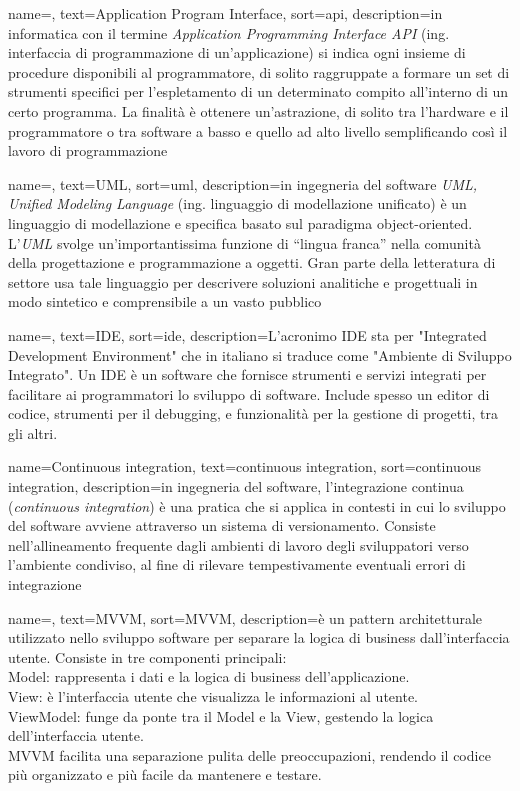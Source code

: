  {
    name=,
    text=Application Program Interface,
    sort=api,
    description={in informatica con il termine \emph{Application Programming Interface API} (ing. interfaccia di programmazione di un'applicazione) si indica ogni insieme di procedure disponibili al programmatore, di solito raggruppate a formare un set di strumenti specifici per l'espletamento di un determinato compito all'interno di un certo programma. La finalità è ottenere un'astrazione, di solito tra l'hardware e il programmatore o tra software a basso e quello ad alto livello semplificando così il lavoro di programmazione}
}

 {
    name=,
    text=UML,
    sort=uml,
    description={in ingegneria del software \emph{UML, Unified Modeling Language} (ing. linguaggio di modellazione unificato) è un linguaggio di modellazione e specifica basato sul paradigma object-oriented. L'\emph{UML} svolge un'importantissima funzione di ``lingua franca'' nella comunità della progettazione e programmazione a oggetti. Gran parte della letteratura di settore usa tale linguaggio per descrivere soluzioni analitiche e progettuali in modo sintetico e comprensibile a un vasto pubblico}
}

 {
    name=,
    text=IDE,
    sort=ide,
    description={L'acronimo IDE sta per "Integrated Development Environment" che in italiano si traduce come "Ambiente di Sviluppo Integrato". Un IDE è un software che fornisce strumenti e servizi integrati per facilitare ai programmatori lo sviluppo di software. Include spesso un editor di codice, strumenti per il debugging, e funzionalità per la gestione di progetti, tra gli altri.}
}

 {
    name=Continuous integration,
    text=continuous integration,
    sort=continuous integration,
    description={in ingegneria del software, l'integrazione continua (\textit{continuous integration}) è una pratica che si applica in contesti in cui lo sviluppo del software avviene attraverso un sistema di versionamento. Consiste nell'allineamento frequente dagli ambienti di lavoro degli sviluppatori verso l'ambiente condiviso, al fine di rilevare tempestivamente eventuali errori di integrazione}
}

 {
    name=,
    text=MVVM,
    sort=MVVM,
    description={è un pattern architetturale utilizzato nello sviluppo software per separare la logica di business dall'interfaccia utente. Consiste in tre componenti principali:\\
    Model: rappresenta i dati e la logica di business dell'applicazione.\\
    View: è l'interfaccia utente che visualizza le informazioni al utente.\\
    ViewModel: funge da ponte tra il Model e la View, gestendo la logica dell'interfaccia utente.\\
    MVVM facilita una separazione pulita delle preoccupazioni, rendendo il codice più organizzato e più facile da mantenere e testare.}
}


